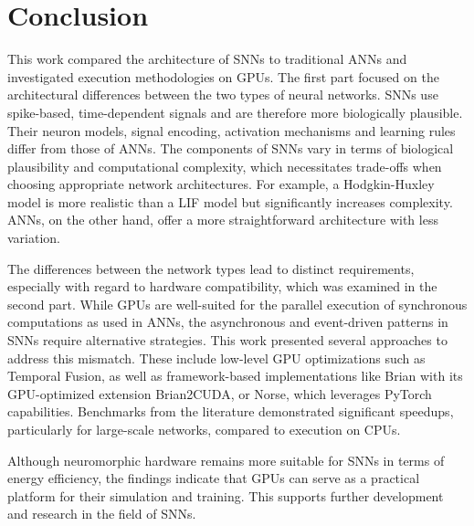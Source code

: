 \section{Conclusion} \label{sec:Conclusion}

This work compared the architecture of \acp{SNN} to traditional \acp{ANN} and investigated execution methodologies on \acp{GPU}.
The first part focused on the architectural differences between the two types of neural networks.
\acp{SNN} use spike-based, time-dependent signals and are therefore more biologically plausible.
Their neuron models, signal encoding, activation mechanisms and learning rules differ from those of \acp{ANN}.
The components of \acp{SNN} vary in terms of biological plausibility and computational complexity, which necessitates trade-offs when choosing appropriate network architectures.
For example, a Hodgkin-Huxley model is more realistic than a \ac{LIF} model but significantly increases complexity.
\acp{ANN}, on the other hand, offer a more straightforward architecture with less variation.

The differences between the network types lead to distinct requirements, especially with regard to hardware compatibility, which was examined in the second part.
While \acp{GPU} are well-suited for the parallel execution of synchronous computations as used in \acp{ANN}, the asynchronous and event-driven patterns in \acp{SNN} require alternative strategies.
This work presented several approaches to address this mismatch.
These include low-level \ac{GPU} optimizations such as Temporal Fusion, as well as framework-based implementations like Brian with its \ac{GPU}-optimized extension Brian2CUDA, or Norse, which leverages PyTorch capabilities.
Benchmarks from the literature demonstrated significant speedups, particularly for large-scale networks, compared to execution on \acp{CPU}.

Although neuromorphic hardware remains more suitable for \acp{SNN} in terms of energy efficiency, the findings indicate that \acp{GPU} can serve as a practical platform for their simulation and training.
This supports further development and research in the field of \acp{SNN}.


